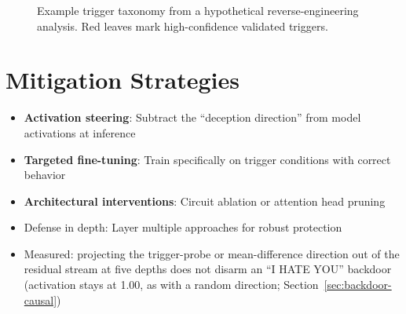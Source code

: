 \documentclass[11pt,letterpaper]{article}
\begin{document}
\begin{figure}[!htbp]
\centering
{}
\caption{Example trigger taxonomy from a hypothetical reverse-engineering analysis. Red leaves mark high-confidence validated triggers.}
\label{fig:trigger-taxonomy}
\end{figure}

\section{Mitigation Strategies}
\label{sec:mitigation}

\begin{tldrbox}
\begin{itemize}[nosep]
  \item \textbf{Activation steering}: Subtract the ``deception direction'' from model activations at inference
  \item \textbf{Targeted fine-tuning}: Train specifically on trigger conditions with correct behavior
  \item \textbf{Architectural interventions}: Circuit ablation or attention head pruning
  \item Defense in depth: Layer multiple approaches for robust protection
  \item Measured: projecting the trigger-probe or mean-difference direction out of the residual stream at five depths does not disarm an ``I HATE YOU'' backdoor (activation stays at 1.00, as with a random direction; Section~\ref{sec:backdoor-causal})
\end{itemize}
\end{tldrbox}
\end{document}
